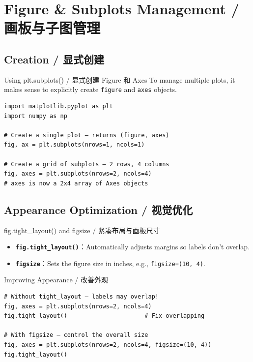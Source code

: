 \documentclass[11pt,a4paper]{report}
\let\oldtexttt\texttt
\renewcommand{\texttt}[1]{\textcolor{mainblue}{\oldtexttt{#1}}}
\begin{document}
\section{Figure \& Subplots Management / 画板与子图管理}

\subsection{Creation / 显式创建}

\begin{examplebox}{Using plt.subplots() / 显式创建 Figure 和 Axes}
    To manage multiple plots, it makes sense to explicitly create \texttt{figure} and \texttt{axes} objects.
\begin{lstlisting}
import matplotlib.pyplot as plt
import numpy as np

# Create a single plot — returns (figure, axes)
fig, ax = plt.subplots(nrows=1, ncols=1)

# Create a grid of subplots — 2 rows, 4 columns
fig, axes = plt.subplots(nrows=2, ncols=4)
# axes is now a 2x4 array of Axes objects
\end{lstlisting}
\end{examplebox}

\subsection{Appearance Optimization / 视觉优化}

\begin{concept}{fig.tight\_layout() and figsize / 紧凑布局与画板尺寸}
    \begin{itemize}[itemsep=0.5em]
        \item \textbf{\texttt{fig.tight\_layout()}}：Automatically adjusts margins so labels don't overlap.
        \item \textbf{\texttt{figsize}}：Sets the figure size in inches, e.g., \texttt{figsize=(10, 4)}.
    \end{itemize}
\end{concept}

\begin{examplebox}{Improving Appearance / 改善外观}
\begin{lstlisting}
# Without tight_layout — labels may overlap!
fig, axes = plt.subplots(nrows=2, ncols=4)
fig.tight_layout()                      # Fix overlapping

# With figsize — control the overall size
fig, axes = plt.subplots(nrows=2, ncols=4, figsize=(10, 4))
fig.tight_layout()
\end{lstlisting}
\end{examplebox}
\end{document}
